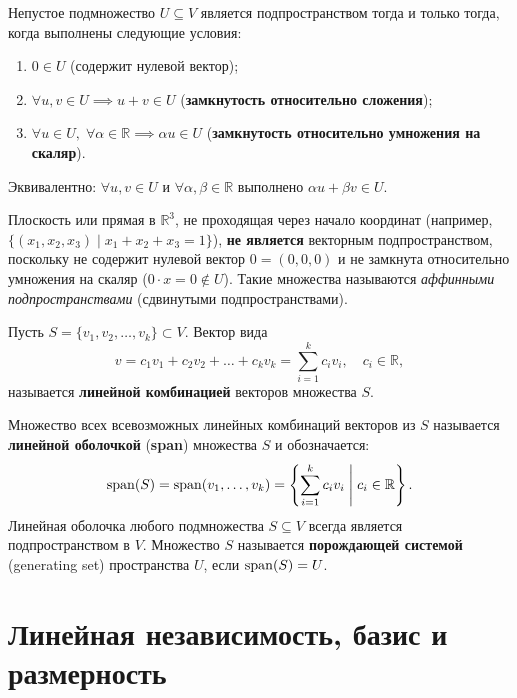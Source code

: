 \begin{theorem}
Непустое подмножество $U \subseteq V$ является подпространством тогда и только тогда, когда выполнены следующие условия:
\begin{enumerate}
    \item $0 \in U$ (содержит нулевой вектор);
    \item $\forall u, v \in U \implies u + v \in U$ (\textbf{замкнутость относительно сложения});
    \item $\forall u \in U, \; \forall \alpha \in \mathbb{R} \implies \alpha u \in U$ (\textbf{замкнутость относительно
    умножения на скаляр}).
\end{enumerate}
Эквивалентно: $\forall u, v \in U$ и $\forall \alpha, \beta \in \mathbb{R}$ выполнено $\alpha u + \beta v \in U$.
\end{theorem}

\begin{remark}
Плоскость или прямая в $\mathbb{R}^3$, не проходящая через начало координат (например, $\{ (x_1, x_2, x_3) \mid x_1 +
x_2 + x_3 = 1 \}$), \textbf{не является} векторным подпространством, поскольку не содержит нулевой вектор $0 = (0,0,0)$
и не замкнута относительно умножения на скаляр ($0 \cdot x = 0 \notin U$).
Такие множества называются \emph{аффинными подпространствами} (сдвинутыми подпространствами).
\end{remark}

\begin{definition}
Пусть $S = \{v_1, v_2, \dots, v_k\} \subset V$.
Вектор вида \[ v = c_1 v_1 + c_2 v_2 + \dots + c_k v_k = \sum_{i=1}^k c_i v_i, \quad c_i \in \mathbb{R}, \]
называется \textbf{линейной комбинацией} векторов множества $S$.

Множество всех всевозможных линейных комбинаций векторов из $S$ называется \textbf{линейной оболочкой} (\textbf{span})
множества $S$ и обозначается:
\[ \operatorname{span}(S) = \operatorname{span}(v_1, \dots, v_k) = \left\{ \sum_{i=1}^k c_i v_i \;\middle|\; c_i \in \mathbb{R} \right\}. \]
Линейная оболочка любого подмножества $S \subseteq V$ всегда является подпространством в $V$.
Множество $S$ называется \textbf{порождающей системой} (generating set) пространства $U$, если $\operatorname{span}(S) = U$.
\end{definition}

\section{Линейная независимость, базис и размерность}

